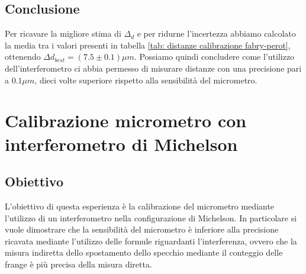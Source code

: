 \documentclass[a4paper]{article}
\begin{document}
\subsection{Conclusione}
Per ricavare la migliore stima di $\Delta_d$ e per ridurne l'incertezza abbiamo calcolato la media tra i valori presenti in tabella \ref{tab: distanze calibrazione fabry-perot}, ottenendo $\Delta d_{best} = (7.5 \pm 0.1) \mu m$. Possiamo quindi concludere come l'utilizzo dell'interferometro ci abbia permesso di misurare distanze con una precisione pari a $0.1 \mu m$, dieci volte superiore rispetto alla sensibilità del micrometro.


\section{Calibrazione micrometro con interferometro di Michelson}
\subsection{Obiettivo}
L'obiettivo di questa esperienza è la calibrazione del micrometro mediante l'utilizzo di un interferometro nella configurazione di Michelson. In particolare si vuole dimostrare che la sensibilità del micrometro è inferiore alla precisione ricavata mediante l'utilizzo delle formule riguardanti l'interferenza, ovvero che la misura indiretta dello spostamento dello specchio mediante il conteggio delle frange è più precisa della misura diretta.
\end{document}
